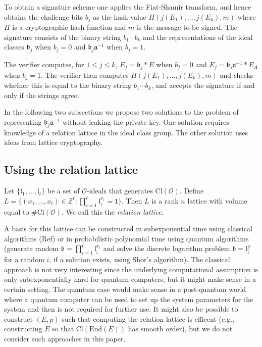\documentclass{llncs}
\newcommand{\OO}{\mathcal{O}}
\newcommand{\Z}{\mathbb{Z}}
\newcommand{\End}{\text{End}}
\newcommand{\Cl}{\text{Cl}}
\renewcommand{\a}{\mathfrak{a}}
\renewcommand{\b}{\mathfrak{b}}
\renewcommand{\l}{\mathfrak{l}}
\begin{document}
To obtain a signature scheme one applies the Fiat-Shamir transform, and hence obtains the challenge bits $b_j$ as the hash value $H( j(E_1), \dots, j(E_k) , m )$ where $H$ is a cryptographic hash function and $m$ is the message to be signed.
The signature consists of the binary string $b_1\cdots b_k$ and the representations of the ideal classes $\b_j$ when $b_j = 0$ and $\b_j \a^{-1}$ when $b_j = 1$.

The verifier computes, for $1 \le j \le k$, $E_j = \b_j * E$ when $b_j = 0$ and $E_j = \b_j \a^{-1} * E_A$ when $b_j = 1$. The verifier then computes $H( j( E_1), \dots, j(E_k), m )$ and checks whether this is equal to the binary string $b_1\cdots b_k$, and accepts the signature if and only if the strings agree.

In the following two subsections we propose two solutions to the problem of representing $\b_j \a^{-1}$ without leaking the private key. One solution requires knowledge of a relation lattice in the ideal class group. The other solution uses ideas from lattice cryptography.

\subsection{Using the relation lattice}

Let $\{ \l_1, \dots, \l_t \}$ be a set of $\OO$-ideals that generates $\Cl( \OO )$.
Define $L = \{ (x_1, \dots, x_t ) \in \Z^t : \prod_{i=1}^t \l_i^{x_i} = 1 \}$.
Then $L$ is a rank $n$ lattice with volume equal to $\#\Cl(\OO)$.
We call this the \emph{relation lattice}.

A basis for this lattice can be constructed in subexponential time using classical algorithms (Ref) or in probabilistic polynomial time using quantum algorithms (generate random $\b = \prod_{i=1}^t \l_i^{x_i} $ and solve the discrete logarithm problem $\b = \l_i^{y}$ for a random $i$, if a solution exists, using Shor's algorithm).
The classical approach is not very interesting since the underlying computational assumption is only subexponentially hard for quantum computers, but it might make sense in a certain setting.
The quantum case would make sense in a post-quantum world where a quantum computer can be used to set up the system parameters for the system and then is not required for further use.
It might also be possible to construct $(E, p )$ such that computing the relation lattice is efficent (e.g., constructing $E$ so that $\Cl( \End(E))$ has smooth order), but we do not consider such approaches in this paper.
\end{document}
